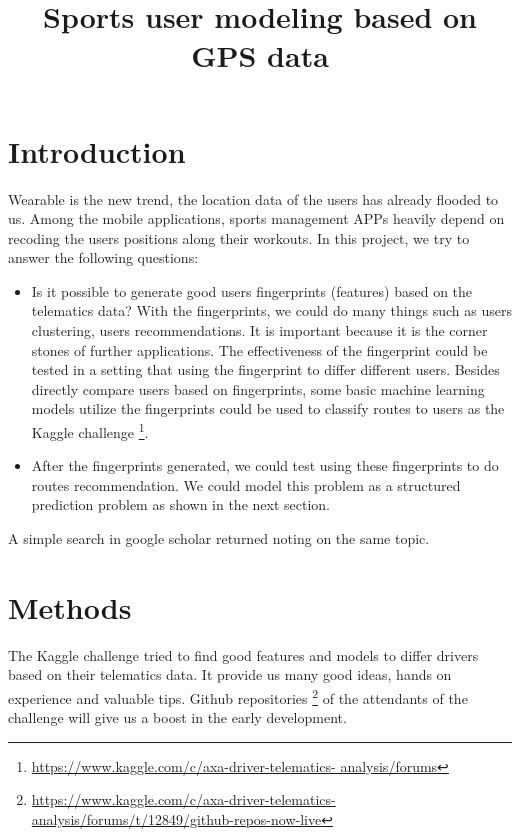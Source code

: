 \documentclass[a4paper,11pt]{article}
\title{Sports user modeling based on GPS data}
\author{}
\date{}
\begin{document}
\maketitle


\section{Introduction}

Wearable is the new trend, the location data of the users has already flooded to us. Among the 
mobile applications, sports management APPs heavily depend on recoding the users positions
along their workouts. In this project, we try to answer the following questions:

\begin{itemize}
\item Is it possible to generate good users fingerprints (features) based on the telematics data? 
With the fingerprints, we could do many things such as users clustering, users recommendations.
It is important because it is the corner stones of further applications. The effectiveness of the 
fingerprint could be tested in a setting that using the fingerprint to differ different users. 
Besides directly compare users based on fingerprints, some basic machine learning models
utilize the fingerprints could be used to classify routes to users as the Kaggle challenge
 \footnote{\url{https://www.kaggle.com/c/axa-driver-telematics-
analysis/forums}\label{fn:1}}.

\item After the fingerprints generated, we could test using these fingerprints to do routes 
recommendation. We could model this problem as a structured prediction problem as shown in 
the next section.
\end{itemize}

A simple search in google scholar returned noting on the same topic. 

\section{Methods}

The Kaggle challenge tried to find good features and 
models to differ drivers based on their telematics
data. It provide us many good ideas,  hands on experience and valuable tips. 
Github repositories \footnote{\url{https://www.kaggle.com/c/axa-driver-telematics-analysis/forums/t/12849/github-repos-now-live}} of the attendants of the challenge will give us a boost in the early
development. 
\end{document}
